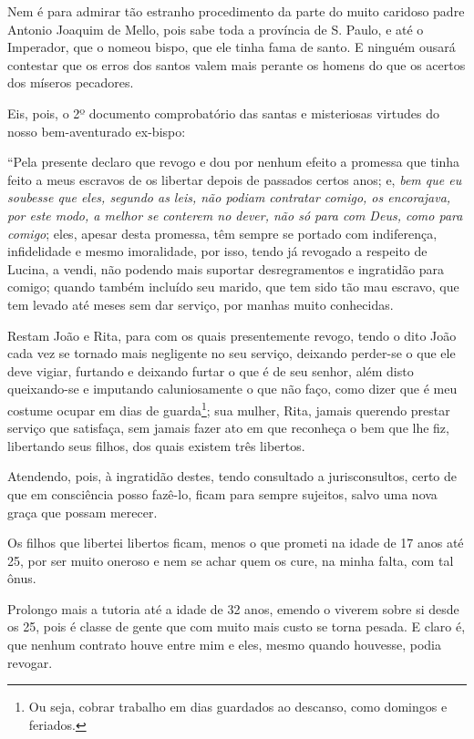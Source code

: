 Nem é para admirar tão estranho procedimento da parte do muito caridoso
padre Antonio Joaquim de Mello, pois sabe toda a província de S. Paulo,
e até o Imperador, que o nomeou bispo, que ele tinha fama de santo. E
ninguém ousará contestar que os erros dos santos valem mais perante os
homens do que os acertos dos míseros pecadores.

Eis, pois, o 2º documento comprobatório das santas e misteriosas
virtudes do nosso bem-aventurado ex-bispo:

``Pela presente declaro que revogo e dou por nenhum efeito a promessa que
tinha feito a meus escravos de os libertar depois de passados certos
anos; e, \emph{bem que eu soubesse que eles, segundo as leis, não podiam
contratar comigo, os encorajava, por este modo, a melhor se conterem no
dever, não só para com Deus, como para comigo}; eles, apesar desta
promessa, têm sempre se portado com indiferença, infidelidade e mesmo
imoralidade, por isso, tendo já revogado a respeito de Lucina, a vendi,
não podendo mais suportar desregramentos e ingratidão para comigo;
quando também incluído seu marido, que tem sido tão mau escravo, que tem
levado até meses sem dar serviço, por manhas muito conhecidas.

Restam João e Rita, para com os quais presentemente revogo, tendo o dito
João cada vez se tornado mais negligente no seu serviço, deixando
perder-se o que ele deve vigiar, furtando e deixando furtar o que é de
seu senhor, além disto queixando-se e imputando caluniosamente o que não
faço, como dizer que é meu costume ocupar em dias de guarda\footnote{
  Ou seja, cobrar trabalho em dias guardados ao descanso, como domingos
  e feriados.}; sua mulher, Rita, jamais querendo prestar serviço que
satisfaça, sem jamais fazer ato em que reconheça o bem que lhe fiz,
libertando seus filhos, dos quais existem três libertos.

Atendendo, pois, à ingratidão destes, tendo consultado a jurisconsultos,
certo de que em consciência posso fazê-lo, ficam para sempre sujeitos,
salvo uma nova graça que possam merecer.

Os filhos que libertei libertos ficam, menos o que prometi na idade de
17 anos até 25, por ser muito oneroso e nem se achar quem os cure, na
minha falta, com tal ônus.

Prolongo mais a tutoria até a idade de 32 anos, emendo o viverem sobre
si desde os 25, pois é classe de gente que com muito mais custo se torna
pesada. E claro é, que nenhum contrato houve entre mim e eles, mesmo
quando houvesse, podia revogar.

